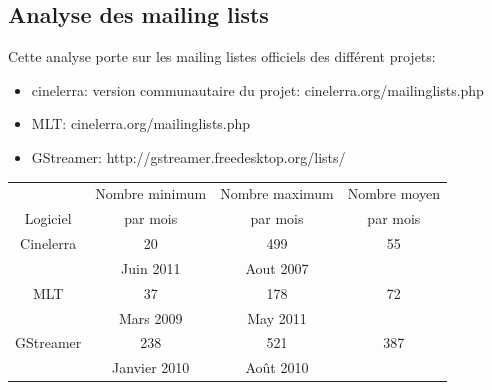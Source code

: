 \subsection {Analyse des mailing lists}

Cette analyse porte sur les mailing listes officiels des différent
projets:

\begin{itemize}

  \item {cinelerra: version communautaire du projet:
    cinelerra.org/mailinglists.php}

  \item {MLT: cinelerra.org/mailinglists.php}

  \item {GStreamer: http://gstreamer.freedesktop.org/lists/}

\end{itemize}


\begin{center}

  \begin{tabular}{ | c | c | c | c|}

    \hline

         & Nombre minimum & Nombre maximum & Nombre moyen \\

Logiciel & par mois       & par mois   & par mois \\

\hline \hline

Cinelerra & 20 & 499 & 55 \\

          &  Juin 2011 & Aout 2007 & \\

\hline

MLT\index{MLT} & 37 & 178 & 72 \\

     & Mars 2009 & May 2011 & \\

\hline

GStreamer & 238 & 521 &  387\\

          & Janvier 2010 & Août 2010 & \\

\hline

  \end{tabular}

\end{center}

